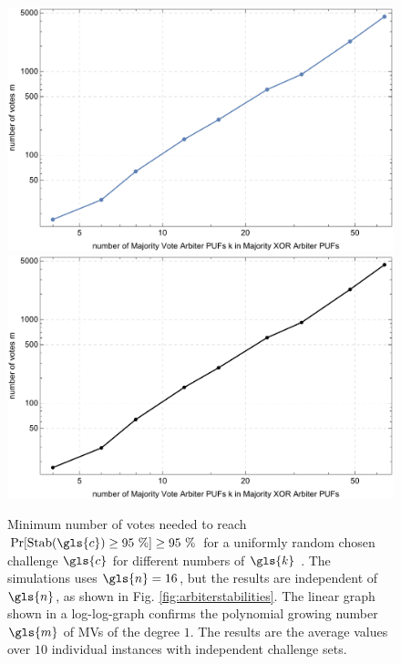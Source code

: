 \begin{figure}[ht]
\ifx{}\undefined
{}
\else
	\if{}
\centering
\includegraphics[width=1.00\textwidth]{images/votes-stab-simulation.pdf}
	\else
\includegraphics[width=1.00\textwidth]{images/votes-stab-simulation_mono.pdf} 
    \fi
\fi
\caption[Number of votes needed for large Majority \acs{XOR} \apufs]{Minimum number of votes needed to reach $\Pr[\protect\Stab(\gls{c}) \ge 95\ \%] \ge 95\ \%$ for a uniformly random chosen challenge $\gls{c}$ for different numbers of $\gls{k}$ \apufs. 
The simulations uses $\gls{n} = 16$, but the results are independent of $\gls{n}$, as shown in Fig. \ref{fig:arbiterstabilities}. 
The linear graph shown in a log-log-graph confirms the polynomial growing number $\gls{m}$ of \acp{MV} of the degree $1$.
The results are the average values over $10$ individual \puf instances with independent challenge sets.} 
\label{fig:majorityvotegrowth}
\end{figure}
\pagebreak

